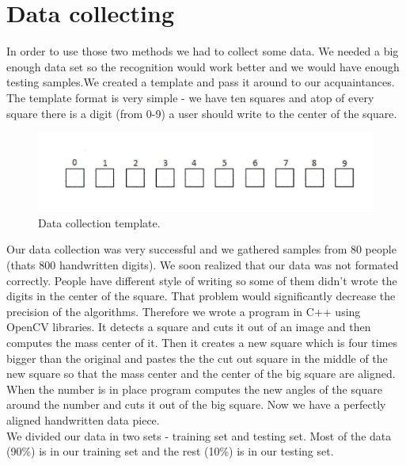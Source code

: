 \documentclass[12pt]{article}
\begin{document}
\newpage
\section{Data collecting}
In order to use those two methods we had to collect some data. We needed a big enough data set so the recognition would work better and we would have enough testing samples.We created a template and pass it around to our acquaintances. The template format is very simple - we have ten squares and atop of every square there is a digit (from 0-9) a user should write to the center of the square.
\begin{figure}[h]
	\centering
	\includegraphics[clip,scale=0.62]{images/empty_temp.png}
	\caption[Data collection template]{Data collection template.}
	
\end{figure}
\newline
Our data collection was very successful and we gathered samples from 80 people (thats 800 handwritten digits). We soon realized that our data was not formated correctly. People have different style of writing so some of them didn't wrote the digits in the center of the square. That problem would significantly decrease the precision of the algorithms. Therefore we wrote a program in C++ using OpenCV libraries. It detects a square and cuts it out of an image and then computes the mass center of it. Then it creates a new square which is four times bigger than the original and pastes the the cut out square in the middle of the new square so that the mass center and the center of the big square are aligned. When the number is in place program computes the new angles of the square around the number and cuts it out of the big square. Now we have a perfectly aligned handwritten data piece.\\
\newline
We divided our data in two sets - training set and testing set. Most of the data (90\%) is in our training set and the rest (10\%) is in our testing set.\\
\end{document}
